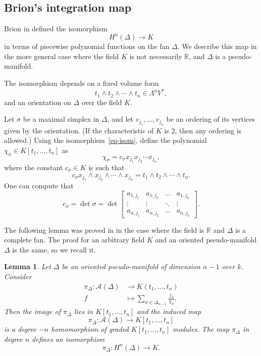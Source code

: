 \documentclass[10pt]{article}
\newtheorem{lemma}[theorem]{Lemma}
\theoremstyle{definition}
\newcommand{\RR}{{\mathbb{R}}}
\newcommand{\cA}{{\mathcal A}}
\renewcommand{\a}[1]{a_{#1}}
\begin{document}
\subsection{Brion's integration map}

Brion in \cite{Brion} defined the isomorphism 
\[  H^n(\Delta) \to K \]
in terms of piecewise polynomial functions on the fan $\Delta$. We describe this map in the more general case where the field $K$ is not necessarily  $\RR$, and $\Delta$ is a pseudo-manifold.

The isomorphism depends on a fixed volume form 
\[ t_1\wedge t_2 \wedge \cdots \wedge t_n \in \Lambda^n V^*,\]
and an orientation on $\Delta$ over the field $K$.  

Let $\sigma$ be a maximal simplex in $\Delta$, and let $v_{j_1},\ldots,v_{j_n}$ be an ordering of its vertices given by the orientation. (If the characteristic of $K$ is $2$, then any ordering is allowed.)
Using the isomorphism~\eqref{eq-isom}, define the polynomial $\chi_\sigma \in K[t_1,\ldots, t_n]$ as
\[ \chi_\sigma = c_\sigma x_{j_1} x_{j_2} \cdots x_{j_n},\]
where the constant $c_\sigma \in K$ is such that 
\[ c_\sigma x_{j_1} \wedge x_{j_2} \wedge \cdots \wedge x_{j_n} = t_1\wedge t_2 \wedge \cdots \wedge t_n.\]
One can compute that 
 \begin{equation} \label{eq-dets}
  c_\sigma= \det\sigma = \det \begin{bmatrix} 
 \a{1, j_1} & \a{1, j_2} & \ldots & \a{1, j_n} \\
 \vdots & \vdots & \ddots & \vdots \\
  \a{n, j_1} & \a{n, j_2} & \ldots & \a{n, j_n}
  \end{bmatrix}.
  \end{equation}

The following lemma was proved in \cite[Theorem~2.2]{Brion} in the case where the field is $\RR$ and $\Delta$ is a complete fan. The proof for an arbitrary field $K$ and an oriented pseudo-manifold $\Delta$ is the same, so we recall it.  

\begin{lemma} 
Let $\Delta$ be an oriented pseudo-manifold of dimension $n-1$ over $k$. Consider
\begin{align} \label{eq-int}
 \pi_{\Delta}: \cA(\Delta) & \to K(t_1, \ldots, t_n) \\ \nonumber
 f & \mapsto  \sum_{\sigma \in \Delta_{n-1}} \frac{f_\sigma}{\chi_\sigma}.
 \end{align} 
Then the image of $\pi_{\Delta}$ lies in $K[t_1, \ldots, t_n]$ and the induced map
\[ \pi_{\Delta}: \cA(\Delta)  \to K[t_1, \ldots, t_n]\]
is a degree $-n$ homomorphism of graded $K[t_1,\ldots, t_n]$ modules. The map $\pi_{\Delta}$ in degree $n$ defines an isomorphism
\begin{equation*} 
 \pi_{\Delta}: H^n(\Delta) \to K.
 \end{equation*}
\end{lemma}
\end{document}
